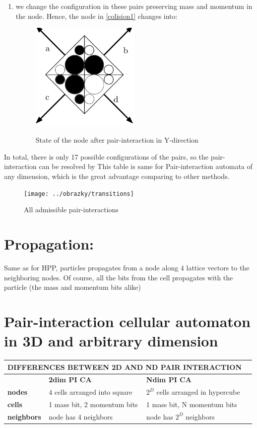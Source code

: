\begin{enumerate}
\item we change the configuration in these pairs preserving mass and momentum in the node. Hence, the node in \ref{colision1} changes into:
 \begin{figure}[htbp]
 \centering 
 \includegraphics[width=0.5\textwidth]{./img/node_3}
 \label{colision2}
 \caption{State of the node after pair-interaction in Y-direction}
\end{figure}
\newpage
\end{enumerate}

In total, there is only 17 possible configurations of the pairs, so the pair-interaction can be resolved by This table is same for Pair-interaction automata of any dimension, which is the great advantage comparing to other methods.
\newpage
\begin{figure}[htbp]
 \centering 
 \texttt{[image: ../obrazky/transitions]}
 \label{transitions}
 \caption{All admissible pair-interactions}
\end{figure}

\section{Propagation:}
Same as for HPP, particles propagates from a node along $4$ lattice vectors to the neighboring nodes. Of course, all the bits from the cell propagates with the particle (the mass and momentum bits alike)


\section{Pair-interaction cellular automaton in 3D and arbitrary dimension}
\begin{center}
    \begin{tabular}{| l | l | l | l |}
    \hline
    \multicolumn{3}{|c|}{DIFFERENCES BETWEEN \textbf{2}D AND \textbf{N}D PAIR INTERACTION}\\ \hline
     & \textbf{2dim PI CA} & \textbf{Ndim PI CA} \\ \hline
    \textbf{nodes} & $4$ cells arranged into square & $2^D$ cells arranged in hypercube \\ \hline
    \textbf{cells} & 1 mass bit, 2 momentum bits  & 1 mass bit, N momentum bits \\ \hline
    \textbf{neighbors} & node has 4 neighbors & node has $2^D$ neighbors  \\ \hline
    \end{tabular}
\end{center}

